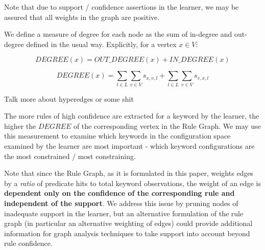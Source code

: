 Note that due to support / confidence assertions in the learner, we
may be assured that all weights in the graph are positive.

We define a measure of degree for each node as the sum of in-degree
and out-degree defined in the usual way. Explicitly, for a vertex $x \in V$:

    $$DEGREE(x) = OUT\_DEGREE(x) + IN\_DEGREE(x)$$

    $$DEGREE(x) = \sum_{l \in L} \sum_{v \in V} s_{x, v, l} + \sum_{l \in L} \sum_{v \in V} s_{v, x, l}$$

Talk more about hyperedges or some shit
\iffalse

Note that we will be summing in-degree and out-degree over all
relationships $l$ to determine the total importance of
a keyword $k$ in the configuration space. We are restricted
by the total set of learning modules from which to derive
relationships $l$. If a keyword were highly constrained by some
relationship to other keywords in a way that might not be
measurable by current techniques, the learner (and
consequently the rule graph) will show these keywords as being
unrelated.

\fi


The more rules of high confidence are extracted for a keyword by the learner, 
the higher the $DEGREE$ of the corresponding vertex in the Rule Graph.
We may use this measurement to examine which keywords in the configuration
space examined by the learner are most important - which keyword configurations
are the most constrained / most constraining.

Note that since the Rule Graph, as it is formulated in this paper, weights edges
by a {\it ratio} of predicate hits to total keyword observations, the weight
of an edge is {\bf dependent only on the confidence of the corresponding rule
and independent of the support}. We address this issue by pruning nodes of
inadequate support in the learner, but an alternative formulation of the rule
graph (in particular an alternative weighting of edges)
could provide additional
information for graph analysis techniques to take support into account
beyond rule confidence.


